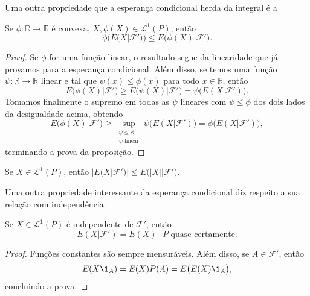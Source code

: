 Uma outra propriedade que a esperança condicional herda da integral é a

\begin{proposition}
  Se $\phi:\mathbb{R} \to \mathbb{R}$ é convexa, $X, \phi(X) \in \mathcal{L}^1(P)$, então
  \begin{equation}
    \phi\big( E(X|\mathcal{F}') \big) \leq E\big( \phi(X) | \mathcal{F}' \big).
  \end{equation}
\end{proposition}

\begin{proof}
  Se $\phi$ for uma função linear, o resultado segue da linearidade que já provamos para a esperança condicional.
  Além disso, se temos uma função $\psi:\mathbb{R} \to \mathbb{R}$ linear e tal que $\psi(x) \leq \phi(x)$ para todo $x \in \mathbb{R}$, então
  \begin{equation}
    E\big( \phi(X) | \mathcal{F}' \big) \geq E\big( \psi(X) | \mathcal{F}' \big) = \psi \big( E(X|\mathcal{F}') \big).
  \end{equation}
  Tomamos finalmente o supremo em todas as $\psi$ lineares com $\psi \leq \phi$ dos dois lados da desigualdade acima, obtendo
  \begin{equation}
    E\big( \phi(X) | \mathcal{F}' \big) \geq \sup_{\substack{\psi \leq \phi\\\psi \text{ linear}}} \psi \big( E(X|\mathcal{F}') \big) = \phi \big( E(X|\mathcal{F}') \big),
  \end{equation}
  terminando a prova da proposição.
\end{proof}

\begin{corollary}
  Se $X \in \mathcal{L}^1(P)$, então $\big| E(X|\mathcal{F}') \big| \leq E\big(|X| \big| \mathcal{F}' \big)$.
\end{corollary}

Uma outra propriedade interessante da esperança condicional diz respeito a sua relação com independência.

\begin{proposition}
  Se $X \in \mathcal{L}^1(P)$ é independente de $\mathcal{F}'$, então
  \begin{equation}
    E(X|\mathcal{F}') = E(X) \text{ $P$-quase certamente.}
  \end{equation}
\end{proposition}

\begin{proof}
  Funções constantes são sempre mensuráveis. Além disso, se $A \in \mathcal{F}'$, então
  \begin{equation}
    E(X \1_A) = E(X) P(A) = E\big( E(X) \1_A \big),
  \end{equation}
  concluindo a prova.
\end{proof}

